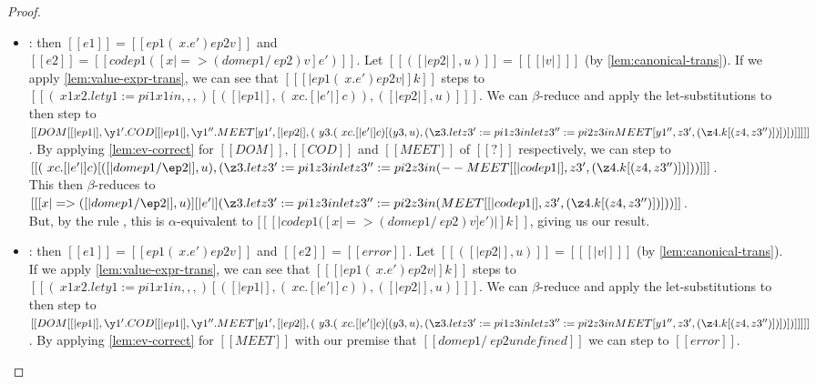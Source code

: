 \documentclass[11pt]{article}
\newcommand{\rrule}[1]{\rref*{#1}}
\begin{document}
\begin{proof}
\begin{itemize}
		\item \rrule{RedAppEv}: then $[[e1]] = [[ ep1 (\ x  . e') ep2 v ]]$ and \\$[[e2]]=[[ cod ep1 ([x |=> (dom ep1 /\ ep2) v]e') ]]$. 
		Let $[[( [|ep2|], u)]] = [[ [|v|] ]]$ (by \autoref{lem:canonical-trans}).
        If we apply \autoref{lem:value-expr-trans}, we can see that $[[  [|ep1 (\ x . e') ep2 v|]k ]]$
        steps to \\$[[ (\ x1  x2. let y1 := pi1 x1 in ,,,)[( [|ep1|] , (\ x c . [|e'|]c )), ( [|ep2|], u) ]  ]]$.
        We can $\beta$-reduce and apply the let-substitutions to then step to
        \\$[[ DOM [ [|ep1|] , \y1' . COD [  [|ep1|] , \y1''. MEET [y1', [|ep2|], (\ y3 . (\ x c . [|e'|]c ) [(y3, u), (\z3 . let z3' := pi1 z3 in let z3'' := pi2 z3 in MEET[y1'', z3', (\z4. k[(z4, z3'')] ) ] ) ] )] ] ] ]]$.
        By applying \autoref{lem:ev-correct} for $[[DOM]], [[COD]]$ and $[[MEET]]$ of $[[?]]$ respectively,
        we can step to  
        \\$[[  (\ x c . [|e'|]c ) [([|dom ep1 /\ep2|], u), (\z3 . let z3' := pi1 z3 in let z3'' := pi2 z3 in \\(--MEET[ [|cod ep1|] , z3', (\z4. k[(z4, z3'')] ) ]) ) ] ]]$.
		\\This then $\beta$-reduces to 
		\\$[[  [ x |=> ([|dom ep1 /\ep2|], u) ][|e'|](\z3 . let z3' := pi1 z3 in let z3'' := pi2 z3 in \\(MEET[ [|cod ep1|] , z3', (\z4. k[(z4, z3'')] ) ]) ) ]]$.
		\\But, by the rule \rrule{TransformEv}, this is $\alpha$-equivalent to  $[[ [|cod ep1 ([x |=> (dom ep1 /\ ep2) v]e')|]k ]]$,
		giving us our result.

		\item \rrule{RedAppEvFail}: then $[[e1]] = [[ ep1 (\ x  . e') ep2 v ]]$ and $[[e2]]=[[ error ]]$.
		Let $[[( [|ep2|], u)]] = [[ [|v|] ]]$ (by \autoref{lem:canonical-trans}).
        If we apply \autoref{lem:value-expr-trans}, we can see that $[[  [|ep1 (\ x  . e') ep2 v|]k ]]$
        steps to \\$[[ (\ x1  x2. let y1 := pi1 x1 in ,,,)[( [|ep1|] , (\ x c . [|e'|]c )), ( [|ep2|], u) ]  ]]$.
        We can $\beta$-reduce and apply the let-substitutions to then step to
        \\$[[ DOM [ [|ep1|] , \y1' . COD [  [|ep1|] , \y1''. MEET [y1', [|ep2|], (\ y3 . (\ x c . [|e'|]c ) [(y3, u), (\z3 . let z3' := pi1 z3 in let z3'' := pi2 z3 in MEET[y1'', z3', (\z4. k[(z4, z3'')] ) ] ) ] )] ] ] ]]$.
        By applying \autoref{lem:ev-correct} for $[[MEET]]$ with our premise that $[[dom ep1 /\ ep2 undefined]]$
		we can step to  $[[error]]$.
		

\end{itemize}
\end{proof}
\end{document}

